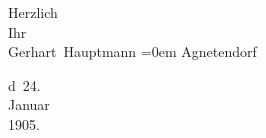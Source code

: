 \pstart
           Herzlich{\\[\baselineskip]} Ihr{\\[\baselineskip]}\spacefill\mbox{Gerhart Hauptmann}\pend
           \leftskip=0em{}
\pstart
           \noindent{}{\pb}Agnetendorf\pend
           
\pstart
           d 24.{\\}Januar{\\}1905.\pend
           \endnumbering{}  \newcommand{\dateiname}{L01494}\newcommand{\titel}{Gerhart Hauptmann an Arthur Schnitzler, 24. 1. 1905}\newcommand{\editorInnen}{Martin Anton Müller und Gerd-Hermann Susen}
